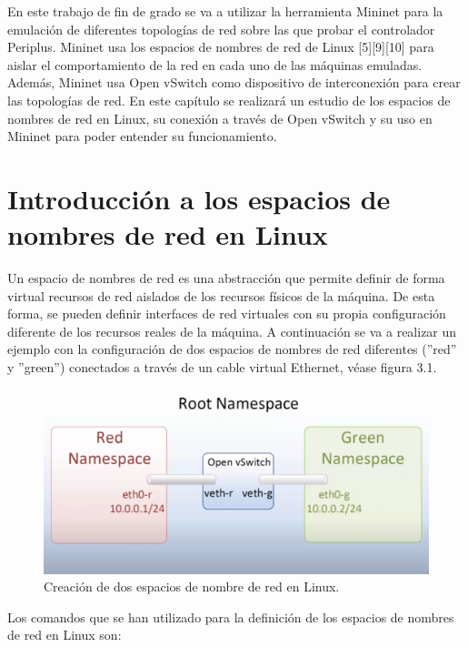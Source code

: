 \documentclass[a4paper, 12pt]{book}
\begin{document}
	En este trabajo de fin de grado se va a utilizar la herramienta Mininet para la emulación de diferentes
	topologías de red sobre las que probar el controlador Periplus. Mininet usa los espacios de nombres
	de red de Linux [5][9][10] para aislar el comportamiento de la red en cada uno de las máquinas emuladas. Además,
	Mininet usa Open vSwitch como dispositivo de interconexión para crear las topologías de red. En
	este capítulo se realizará un estudio de los espacios de nombres de red en Linux, su conexión
	a través de Open vSwitch y su uso en Mininet para poder entender su funcionamiento.
	
	\section{Introducción a los espacios de nombres de red en Linux}
	
	Un espacio de nombres de red es una abstracción que permite definir de forma virtual recursos de red
	aislados de los recursos físicos de la máquina. De esta forma, se pueden definir interfaces de red virtuales
	con su propia configuración diferente de los recursos reales de la máquina. A continuación se va a
	realizar un ejemplo con la configuración de dos espacios de nombres de red diferentes (''red'' y ''green'')
	conectados a través de un cable virtual Ethernet, véase figura 3.1.

	\begin{figure}[H]
		\centering
		\includegraphics[width=14cm, keepaspectratio]{img/Linux namespaces}
		\caption{Creación de dos espacios de nombre de red en Linux.}
		\label{figura:linux_namespaces}
	\end{figure}
	
	Los comandos que se han utilizado para la definición de los espacios de nombres de red en Linux son:
	
\end{document}
